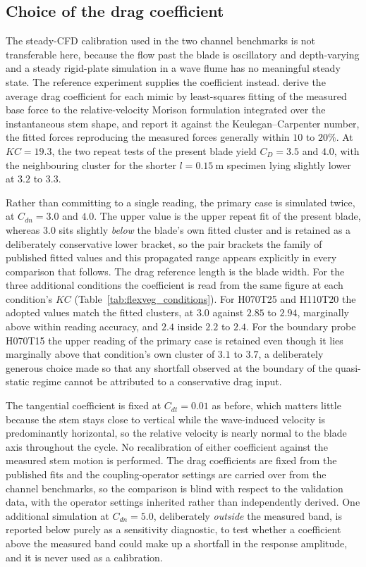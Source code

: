 \subsection{Choice of the drag coefficient}
\label{sec:flexveg_cd}
The steady-CFD calibration used in the two channel benchmarks is not transferable here, because the flow past the blade is oscillatory and depth-varying and a steady rigid-plate simulation in a wave flume has no meaningful steady state. The reference experiment supplies the coefficient instead. \citet{jacobsen_waveinduced_2019} derive the average drag coefficient for each mimic by least-squares fitting of the measured base force to the relative-velocity Morison formulation integrated over the instantaneous stem shape, and report it against the Keulegan--Carpenter number, the fitted forces reproducing the measured forces generally within $10$ to $20\%$. At $KC = 19.3$, the two repeat tests of the present blade yield $C_D = 3.5$ and $4.0$, with the neighbouring cluster for the shorter $l = 0.15~\mathrm{m}$ specimen lying slightly lower at $3.2$ to $3.3$.

\noindent
Rather than committing to a single reading, the primary case is simulated twice, at $C_{dn} = 3.0$ and $4.0$. The upper value is the upper repeat fit of the present blade, whereas $3.0$ sits slightly \emph{below} the blade's own fitted cluster and is retained as a deliberately conservative lower bracket, so the pair brackets the family of published fitted values and this propagated range appears explicitly in every comparison that follows. The drag reference length is the blade width. For the three additional conditions the coefficient is read from the same figure at each condition's $KC$ (Table~\ref{tab:flexveg_conditions}). For H070T25 and H110T20 the adopted values match the fitted clusters, at $3.0$ against $2.85$ to $2.94$, marginally above within reading accuracy, and $2.4$ inside $2.2$ to $2.4$. For the boundary probe H070T15 the upper reading of the primary case is retained even though it lies marginally above that condition's own cluster of $3.1$ to $3.7$, a deliberately generous choice made so that any shortfall observed at the boundary of the quasi-static regime cannot be attributed to a conservative drag input.

\noindent
The tangential coefficient is fixed at $C_{dt} = 0.01$ as before, which matters little because the stem stays close to vertical while the wave-induced velocity is predominantly horizontal, so the relative velocity is nearly normal to the blade axis throughout the cycle. No recalibration of either coefficient against the measured stem motion is performed. The drag coefficients are fixed from the published fits and the coupling-operator settings are carried over from the channel benchmarks, so the comparison is blind with respect to the validation data, with the operator settings inherited rather than independently derived. One additional simulation at $C_{dn} = 5.0$, deliberately \emph{outside} the measured band, is reported below purely as a sensitivity diagnostic, to test whether a coefficient above the measured band could make up a shortfall in the response amplitude, and it is never used as a calibration.

